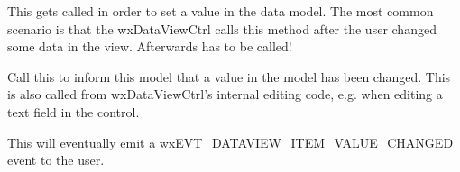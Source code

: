 
This gets called in order to set a value in the data model.
The most common scenario is that the wxDataViewCtrl calls
this method after the user changed some data in the view.
Afterwards 
has to be called!

\label{wxdataviewmodelvaluechanged}


Call this to inform this model that a value in the model has
been changed. This is also called from wxDataViewCtrl's
internal editing code, e.g. when editing a text field 
in the control.

This will eventually emit a wxEVT\_DATAVIEW\_ITEM\_VALUE\_CHANGED
event to the user.

